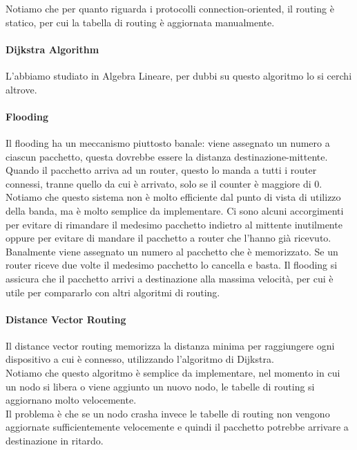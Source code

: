 \documentclass{article}
\begin{document}
Notiamo che per quanto riguarda i protocolli connection-oriented, il routing è
statico, per cui la tabella di routing è aggiornata manualmente.\\

\paragraph{Dijkstra Algorithm}
L'abbiamo studiato in Algebra Lineare, per dubbi su questo algoritmo lo si
cerchi altrove.\\

\paragraph{Flooding}
Il flooding ha un meccanismo piuttosto banale: viene assegnato un numero a
ciascun pacchetto, questa dovrebbe essere la distanza destinazione-mittente.
Quando il pacchetto arriva ad un router, questo lo manda a tutti i router
connessi, tranne quello da cui è arrivato, solo se il counter è maggiore di 0.
Notiamo che questo sistema non è molto efficiente dal punto di vista di utilizzo
della banda, ma è molto semplice da implementare. Ci sono alcuni accorgimenti
per evitare di rimandare il medesimo pacchetto indietro al mittente inutilmente
oppure per evitare di mandare il pacchetto a router che l'hanno già ricevuto.
Banalmente viene assegnato un numero al pacchetto che è memorizzato. Se un
router riceve due volte il medesimo pacchetto lo cancella e basta. Il flooding
si assicura che il pacchetto arrivi a destinazione alla massima velocità, per
cui è utile per compararlo con altri algoritmi di routing.\\

\paragraph{Distance Vector Routing}
Il distance vector routing memorizza la distanza minima per raggiungere ogni
dispositivo a cui è connesso, utilizzando l'algoritmo di Dijkstra.\\
Notiamo che questo algoritmo è semplice da implementare, nel momento in cui un
nodo si libera o viene aggiunto un nuovo nodo, le tabelle di routing si
aggiornano molto velocemente.\\
Il problema è che se un nodo crasha invece le tabelle di routing non vengono
aggiornate sufficientemente velocemente e quindi il pacchetto potrebbe
arrivare a destinazione in ritardo.\\
\end{document}
